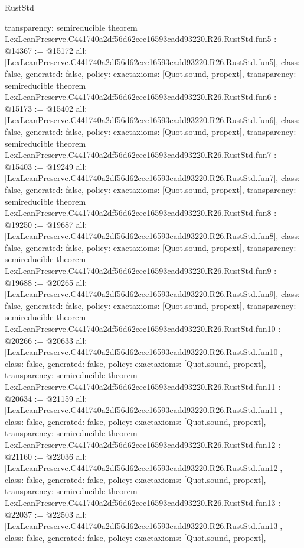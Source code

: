 \begin{lexlean}{RustStd}
\begin{coremodule}
{  transparency: semireducible
}
theorem LexLeanPreserve.C441740a2df56d62eec16593cadd93220.R26.RustStd.fun5 : @14367 := @15172 {
  all: [LexLeanPreserve.C441740a2df56d62eec16593cadd93220.R26.RustStd.fun5],
  class: false,
  generated: false,
  policy: exact{axioms: [Quot.sound, propext]},
  transparency: semireducible
}
theorem LexLeanPreserve.C441740a2df56d62eec16593cadd93220.R26.RustStd.fun6 : @15173 := @15402 {
  all: [LexLeanPreserve.C441740a2df56d62eec16593cadd93220.R26.RustStd.fun6],
  class: false,
  generated: false,
  policy: exact{axioms: [Quot.sound, propext]},
  transparency: semireducible
}
theorem LexLeanPreserve.C441740a2df56d62eec16593cadd93220.R26.RustStd.fun7 : @15403 := @19249 {
  all: [LexLeanPreserve.C441740a2df56d62eec16593cadd93220.R26.RustStd.fun7],
  class: false,
  generated: false,
  policy: exact{axioms: [Quot.sound, propext]},
  transparency: semireducible
}
theorem LexLeanPreserve.C441740a2df56d62eec16593cadd93220.R26.RustStd.fun8 : @19250 := @19687 {
  all: [LexLeanPreserve.C441740a2df56d62eec16593cadd93220.R26.RustStd.fun8],
  class: false,
  generated: false,
  policy: exact{axioms: [Quot.sound, propext]},
  transparency: semireducible
}
theorem LexLeanPreserve.C441740a2df56d62eec16593cadd93220.R26.RustStd.fun9 : @19688 := @20265 {
  all: [LexLeanPreserve.C441740a2df56d62eec16593cadd93220.R26.RustStd.fun9],
  class: false,
  generated: false,
  policy: exact{axioms: [Quot.sound, propext]},
  transparency: semireducible
}
theorem LexLeanPreserve.C441740a2df56d62eec16593cadd93220.R26.RustStd.fun10 : @20266 := @20633 {
  all: [LexLeanPreserve.C441740a2df56d62eec16593cadd93220.R26.RustStd.fun10],
  class: false,
  generated: false,
  policy: exact{axioms: [Quot.sound, propext]},
  transparency: semireducible
}
theorem LexLeanPreserve.C441740a2df56d62eec16593cadd93220.R26.RustStd.fun11 : @20634 := @21159 {
  all: [LexLeanPreserve.C441740a2df56d62eec16593cadd93220.R26.RustStd.fun11],
  class: false,
  generated: false,
  policy: exact{axioms: [Quot.sound, propext]},
  transparency: semireducible
}
theorem LexLeanPreserve.C441740a2df56d62eec16593cadd93220.R26.RustStd.fun12 : @21160 := @22036 {
  all: [LexLeanPreserve.C441740a2df56d62eec16593cadd93220.R26.RustStd.fun12],
  class: false,
  generated: false,
  policy: exact{axioms: [Quot.sound, propext]},
  transparency: semireducible
}
theorem LexLeanPreserve.C441740a2df56d62eec16593cadd93220.R26.RustStd.fun13 : @22037 := @22503 {
  all: [LexLeanPreserve.C441740a2df56d62eec16593cadd93220.R26.RustStd.fun13],
  class: false,
  generated: false,
  policy: exact{axioms: [Quot.sound, propext]},
}
\end{coremodule}
\end{lexlean}
